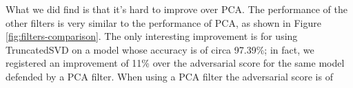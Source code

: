 What we did find is that it's hard to improve over PCA. The performance
of the other filters is very similar to the performance of PCA, as
shown in Figure \ref{fig:filters-comparison}. The only interesting
improvement is for using TruncatedSVD on a model whose accuracy is of
circa 97.39\%; in fact, we registered an improvement of 11\% over the
adversarial score for the same model defended by a PCA filter. When
using a PCA filter the adversarial score is of
